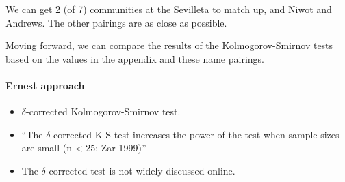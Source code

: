 \documentclass[]{article}
\newenvironment{Shaded}{\begin{snugshade}}{\end{snugshade}}
\newcommand{\KeywordTok}[1]{\textcolor[rgb]{0.13,0.29,0.53}{\textbf{#1}}}
\newcommand{\DataTypeTok}[1]{\textcolor[rgb]{0.13,0.29,0.53}{#1}}
\newcommand{\StringTok}[1]{\textcolor[rgb]{0.31,0.60,0.02}{#1}}
\newcommand{\OperatorTok}[1]{\textcolor[rgb]{0.81,0.36,0.00}{\textbf{#1}}}
\newcommand{\NormalTok}[1]{#1}
\providecommand{\tightlist}{%
  \setlength{\itemsep}{0pt}\setlength{\parskip}{0pt}}
\let\oldparagraph\paragraph
\renewcommand{\paragraph}[1]{\oldparagraph{#1}\mbox{}}
\begin{document}
We can get 2 (of 7) communities at the Sevilleta to match up, and Niwot
and Andrews. The other pairings are as close as possible.

Moving forward, we can compare the results of the Kolmogorov-Smirnov
tests based on the values in the appendix and these name pairings.

\begin{Shaded}
\end{Shaded}

\paragraph{Ernest approach}\label{ernest-approach-2}

\begin{itemize}
\tightlist
\item
  \(\delta\)-corrected Kolmogorov-Smirnov test.
\item
  ``The \(\delta\)-corrected K-S test increases the power of the test
  when sample sizes are small (n \textless{} 25; Zar 1999)''
\item
  The \(\delta\)-corrected test is not widely discussed online.
\end{itemize}

\begin{Shaded}
\end{Shaded}
\end{document}
